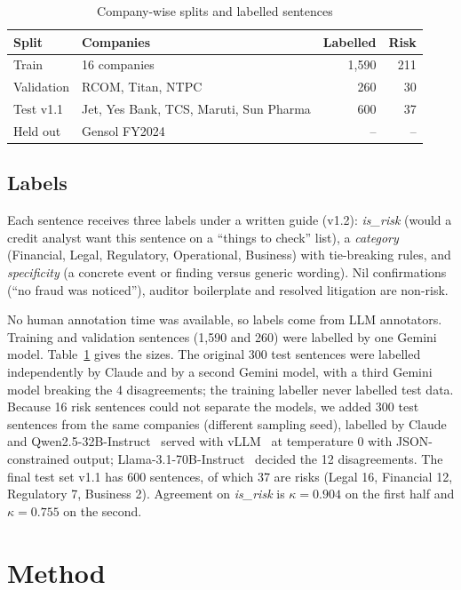 \documentclass[conference]{IEEEtran}
\begin{document}
\begin{table}[t]
\caption{Company-wise splits and labelled sentences}
\label{tab:splits}
\centering
\setlength{\tabcolsep}{4pt}
\begin{tabular}{@{}llrr@{}}
\toprule
Split & Companies & Labelled & Risk \\
\midrule
Train & 16 companies & 1,590 & 211 \\
Validation & RCOM, Titan, NTPC & 260 & 30 \\
Test v1.1 & Jet, Yes Bank, TCS, Maruti, Sun Pharma & 600 & 37 \\
Held out & Gensol FY2024 & -- & -- \\
\bottomrule
\end{tabular}
\end{table}

\subsection{Labels}
Each sentence receives three labels under a written guide (v1.2): \emph{is\_risk} (would a credit analyst want this sentence on a ``things to check'' list), a \emph{category} (Financial, Legal, Regulatory, Operational, Business) with tie-breaking rules, and \emph{specificity} (a concrete event or finding versus generic wording). Nil confirmations (``no fraud was noticed''), auditor boilerplate and resolved litigation are non-risk.

No human annotation time was available, so labels come from LLM annotators. Training and validation sentences (1,590 and 260) were labelled by one Gemini model. Table~\ref{tab:splits} gives the sizes. The original 300 test sentences were labelled independently by Claude and by a second Gemini model, with a third Gemini model breaking the 4 disagreements; the training labeller never labelled test data. Because 16 risk sentences could not separate the models, we added 300 test sentences from the same companies (different sampling seed), labelled by Claude and Qwen2.5-32B-Instruct~\cite{qwen2024} served with vLLM~\cite{kwon2023vllm} at temperature 0 with JSON-constrained output; Llama-3.1-70B-Instruct~\cite{llama3} decided the 12 disagreements. The final test set v1.1 has 600 sentences, of which 37 are risks (Legal 16, Financial 12, Regulatory 7, Business 2). Agreement on \emph{is\_risk} is $\kappa=0.904$ on the first half and $\kappa=0.755$ on the second.

\section{Method}
\end{document}
